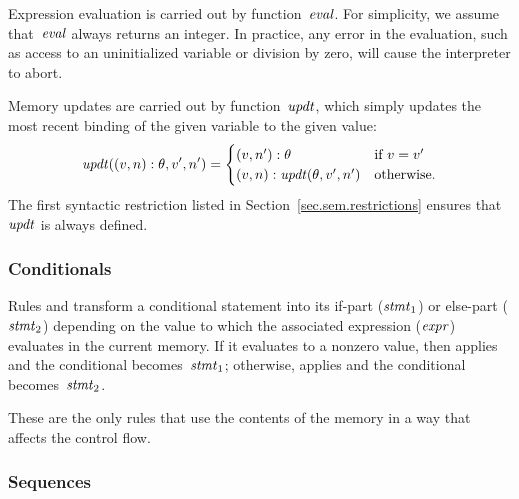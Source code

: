 Expression evaluation is carried out by function~$\mathop{\mathit{eval}}$.  For
simplicity, we assume that~$\mathop{\mathit{eval}}$ always returns an integer.  In
practice, any error in the evaluation, such as access to an uninitialized
variable or division by zero, will cause the interpreter to abort.

Memory updates are carried out by function~$\mathop{\mathit{updt}}$, which simply updates
the most recent binding of the given variable to the given value:
\[
  \mathop{\mathit{updt}}((v,n):\theta,v',n')=
  \begin{cases}
    (v,n'):\theta             &\text{if~$v=v'$}\\
    (v,n):\mathop{\mathit{updt}}(\theta,v',n') &\text{otherwise}.
  \end{cases}
\]
The first syntactic restriction listed in
Section~\ref{sec.sem.restrictions} ensures that~$\mathop{\mathit{updt}}$ is always defined.

\subsubsection*{Conditionals}


Rules  and  transform a conditional statement into
its if-part ($\mathit{stmt}_1$) or else-part ($\mathit{stmt}_2$) depending on the value to
which the associated expression ($\mathit{expr}$) evaluates in the current memory.
If it evaluates to a nonzero value, then  applies and the
conditional becomes~$\mathit{stmt}_1$; otherwise,  applies and the
conditional becomes~$\mathit{stmt}_2$.

These are the only rules that use the contents of the memory in a way that
affects the control flow.

\subsubsection*{Sequences}


